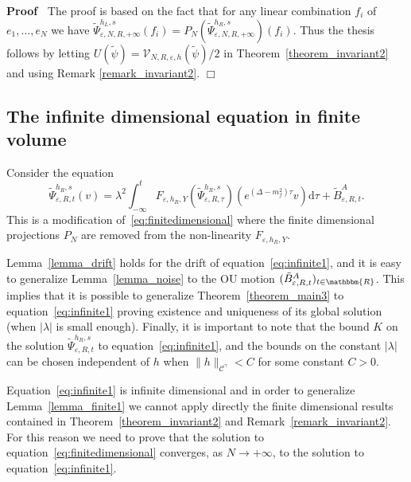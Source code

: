\documentclass[11pt]{article}
\newcommand{\mathd}{\mathrm{d}}
\newenvironment{proof}{\noindent\textbf{Proof\ }}{\hspace*{\fill}$\Box$\medskip}
\begin{document}
\begin{proof}
  The proof is based on the fact that for any linear combination $f_i$ of
  $e_1, \ldots, e_N$ we have $\tilde{\Psi}_{\varepsilon, N, R, + \infty}^{h_L,
  s} (f_i) = P_N (\tilde{\Psi}_{\varepsilon, N, R, + \infty}^{h_R, s}) (f_i)$.
  Thus the thesis follows by letting $U (\tilde{\psi}) =\mathcal{V}_{N, R,
  \varepsilon, h} (\tilde{\psi}) / 2$ in Theorem~\ref{theorem_invariant2} and
  using Remark \ref{remark_invariant2}.
\end{proof}

\subsection{The infinite dimensional equation in finite
volume}\label{sec:cont-finite-vol-yukawa}

Consider the equation
\begin{equation}
  \tilde{\Psi}_{\varepsilon, R, t}^{h_R, s} (v) = \lambda^2 \int_{- \infty}^t
  F_{\varepsilon, h_R, Y} (\tilde{\Psi}_{\varepsilon, R, \tau}^{h_R, s})
  (e^{(\Delta - m^2_f) \tau} v) \mathd \tau + \tilde{B}^A_{\varepsilon, R, t}
  \label{eq:infinite1} .
\end{equation}
This is a modification of~{\eqref{eq:finitedimensional}} where the finite
dimensional projections $P_N$ are removed from the non-linearity
$F_{\varepsilon, h_R, Y}$.

\begin{remark}
  Lemma~\ref{lemma_drift} holds for the drift of
  equation~{\eqref{eq:infinite1}}, and it is easy to generalize
  Lemma~\ref{lemma_noise} to the OU motion $(\tilde{B}_{\varepsilon, R,
  t}^A)_{t \in \mathbbm{R}}$. This implies that it is possible to generalize
  Theorem~\ref{theorem_main3} to equation~{\eqref{eq:infinite1}} proving
  existence and uniqueness of its global solution (when $| \lambda |$ is small
  enough). Finally, it is important to note that the bound $K$ on the solution
  $\tilde{\Psi}_{\varepsilon, R, t}^{h_R, s}$ to
  equation~{\eqref{eq:infinite1}}, and the bounds on the constant $| \lambda
  |$ can be chosen independent of $h$ when $\| h \|_{\mathcal{C}^{\gamma}} <
  C$ for some constant $C > 0$.
\end{remark}

Equation~{\eqref{eq:infinite1}} is infinite dimensional and in order to
generalize Lemma~\ref{lemma_finite1} we cannot apply directly the finite
dimensional results contained in Theorem~\ref{theorem_invariant2} and
Remark~\ref{remark_invariant2}. For this reason we need to prove that the
solution to equation~{\eqref{eq:finitedimensional}} converges, as $N
\rightarrow + \infty$, to the solution to equation~{\eqref{eq:infinite1}}.
\end{document}
